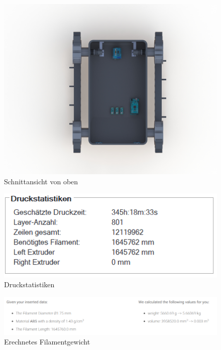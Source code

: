 \begin{figure}[h]
    \centering
    \captionsetup{width=.9\linewidth}
    \includegraphics[width=1\linewidth]{schnitt_top.JPG}
    \caption{Schnittansicht von oben}
    \label{fig:top}
\end{figure}
\begin{figure}[h]
    \centering
    \captionsetup{width=.9\linewidth}
    \includegraphics[width=1\linewidth]{print-statistic.PNG}
    \caption{Druckstatistiken}
    \label{fig:print_stats}
\end{figure}
\begin{figure}[h]
    \centering
    \captionsetup{width=.9\linewidth}
    \includegraphics[width=1\linewidth]{filament_weight.PNG}
    \caption{Erechnetes Filamentgewicht}
    \label{fig:filament_weight}
\end{figure}